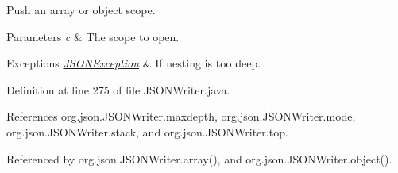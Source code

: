 Push an array or object scope. 
\begin{DoxyParams}{Parameters}
{\em c} & The scope to open. \\
\hline
\end{DoxyParams}

\begin{DoxyExceptions}{Exceptions}
{\em \hyperlink{classorg_1_1json_1_1_j_s_o_n_exception}{J\-S\-O\-N\-Exception}} & If nesting is too deep. \\
\hline
\end{DoxyExceptions}


Definition at line 275 of file J\-S\-O\-N\-Writer.\-java.



References org.\-json.\-J\-S\-O\-N\-Writer.\-maxdepth, org.\-json.\-J\-S\-O\-N\-Writer.\-mode, org.\-json.\-J\-S\-O\-N\-Writer.\-stack, and org.\-json.\-J\-S\-O\-N\-Writer.\-top.



Referenced by org.\-json.\-J\-S\-O\-N\-Writer.\-array(), and org.\-json.\-J\-S\-O\-N\-Writer.\-object().


